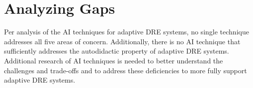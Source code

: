 \documentclass[conference]{IEEEtran}
\begin{document}
\section{Analyzing Gaps}
\label{gap-analysis}
Per analysis of the AI techniques for adaptive DRE systems, no single technique addresses all five areas of concern. Additionally, there is no AI technique that sufficiently addresses the autodidactic property of adaptive DRE systems. Additional research of AI techniques is needed to better understand the challenges and trade-offs and to address these deficiencies to more fully support adaptive DRE systems.

%
%
\end{document}
